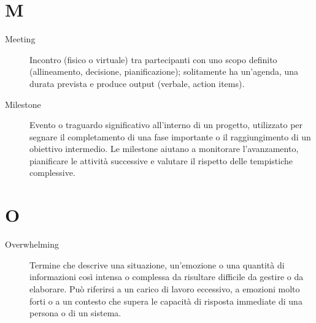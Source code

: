 \section*{M}
\begin{description}
    \item[Meeting] Incontro (fisico o virtuale) tra partecipanti con uno scopo definito (allineamento, decisione, pianificazione); solitamente ha un'agenda, una durata prevista e produce output (verbale, action items).
    \item[Milestone] Evento o traguardo significativo all’interno di un progetto, utilizzato per segnare il completamento di una fase importante o il raggiungimento di un obiettivo intermedio. Le milestone aiutano a monitorare l’avanzamento, pianificare le attività successive e valutare il rispetto delle tempistiche complessive.
\end{description}

\section*{O}
\begin{description}
    \item[Overwhelming] Termine che descrive una situazione, un’emozione o una quantità di informazioni così intensa o complessa da risultare difficile da gestire o da elaborare.  
    Può riferirsi a un carico di lavoro eccessivo, a emozioni molto forti o a un contesto che supera le capacità di risposta immediate di una persona o di un sistema.
\end{description}

